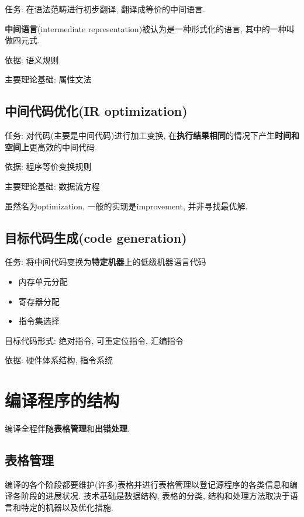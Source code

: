         任务: 在语法范畴进行初步翻译, 翻译成等价的中间语言.

        \textbf{中间语言}(intermediate representation)被认为是一种形式化的语言, 其中的一种叫做四元式.

        依据: 语义规则

        主要理论基础: 属性文法

    \subsection{中间代码优化(IR optimization)}

        任务: 对代码(主要是中间代码)进行加工变换, 在\textbf{执行结果相同}的情况下产生\textbf{时间和空间上}更高效的中间代码.

        依据: 程序等价变换规则

        主要理论基础: 数据流方程

        虽然名为optimization, 一般的实现是improvement, 并非寻找最优解.

    \subsection{目标代码生成(code generation)}

        任务: 将中间代码变换为\textbf{特定机器}上的低级机器语言代码

        \begin{itemize}
            \item 内存单元分配
            \item 寄存器分配
            \item 指令集选择
        \end{itemize}

        目标代码形式: 绝对指令, 可重定位指令, 汇编指令

        依据: 硬件体系结构, 指令系统

\section{编译程序的结构}

    编译全程伴随\textbf{表格管理}和\textbf{出错处理}.

    \subsection{表格管理}

        编译的各个阶段都要维护(许多)表格并进行表格管理以登记源程序的各类信息和编译各阶段的进展状况. 技术基础是数据结构, 表格的分类, 结构和处理方法取决于语言和特定的机器以及优化措施.


